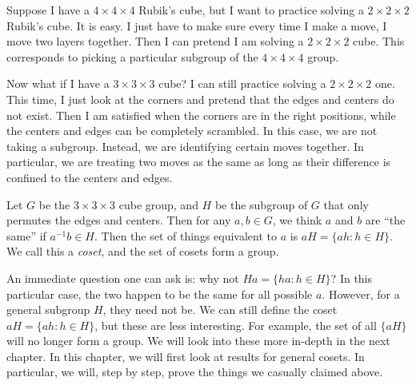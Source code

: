\documentclass[a4paper]{article}
\begin{document}
Suppose I have a $4\times 4\times 4$ Rubik's cube, but I want to practice solving a $2\times 2\times 2$ Rubik's cube. It is easy. I just have to make sure every time I make a move, I move two layers together. Then I can pretend I am solving a $2\times 2\times 2$ cube. This corresponds to picking a particular subgroup of the $4\times 4\times 4$ group.

Now what if I have a $3\times 3\times 3$ cube? I can still practice solving a $2\times 2\times 2$ one. This time, I just look at the corners and pretend that the edges and centers do not exist. Then I am satisfied when the corners are in the right positions, while the centers and edges can be completely scrambled. In this case, we are not taking a subgroup. Instead, we are identifying certain moves together. In particular, we are treating two moves as the same as long as their difference is confined to the centers and edges.

Let $G$ be the $3\times 3\times 3$ cube group, and $H$ be the subgroup of $G$ that only permutes the edges and centers. Then for any $a, b\in G$, we think $a$ and $b$ are ``the same'' if $a^{-1}b \in H$. Then the set of things equivalent to $a$ is $aH = \{ah: h \in H\}$. We call this a \emph{coset}, and the set of cosets form a group.

An immediate question one can ask is: why not $Ha = \{ha: h\in H\}$? In this particular case, the two happen to be the same for all possible $a$. However, for a general subgroup $H$, they need not be. We can still define the coset $aH = \{ah: h \in H\}$, but these are less interesting. For example, the set of all $\{aH\}$ will no longer form a group. We will look into these more in-depth in the next chapter. In this chapter, we will first look at results for general cosets. In particular, we will, step by step, prove the things we casually claimed above.
\end{document}
